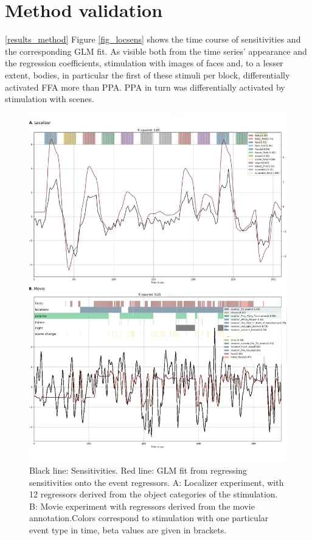 \documentclass[a4paper, 12pt]{scrreprt}
\begin{document}
\section{Method validation}\ref{results_method}
Figure \ref{fig_locsens} shows the time course of sensitivities and the corresponding GLM fit. As visible both from the time series' appearance and the regression coefficients, stimulation with images of faces and, to a lesser extent, bodies, in particular the first of these stimuli per block, differentially activated FFA more than PPA. PPA in turn was differentially activated by stimulation with scenes.
\begin{figure}
	\includegraphics[scale=0.4]{img/sens_timecourse.png}
	\caption[Time course of sensitivites for localizer data]{\small{Black line: Sensitivities. Red line: GLM fit from regressing sensitivities onto the event regressors. A: Localizer experiment, with 12 regressors derived from the object categories of the stimulation. B: Movie experiment with regressors derived from the movie annotation.\newline Colors correspond to stimulation with one particular event type in time, beta values are given in brackets.}}
	\label{fig:locsens}
\end{figure}
\end{document}
